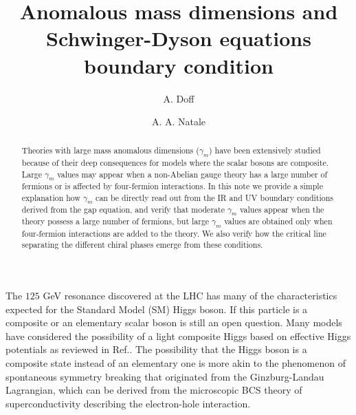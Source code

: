 \documentclass[preprint,amsmath,amssymb,superscriptaddress,showpacs,aps12pt]{revtex4}
\begin{document}
\title{Anomalous mass dimensions and Schwinger-Dyson equations boundary condition}

\author{A. Doff}



\author{A. A. Natale} 



\begin{abstract}
Theories with large mass anomalous dimensions ($\gamma_m$) have been extensively studied because of their deep consequences for models where the scalar bosons are composite. Large $\gamma_m$ values may appear when a non-Abelian gauge theory has a large number of fermions or is affected by four-fermion interactions. In this note we provide a simple explanation how $\gamma_m$ can be directly read out from the IR and UV boundary conditions derived from the gap equation, and verify that moderate $\gamma_m$ values appear when the theory possess a large number of fermions, but large $\gamma_m$ values are obtained only when four-fermion interactions are added to the theory. We also verify how the critical line separating the different chiral phases emerge from these conditions.  
\end{abstract}



\maketitle



\par The $125$ GeV resonance discovered at the LHC \cite{atlas} has many of the characteristics expected for the Standard Model (SM) Higgs boson. If this particle is a composite or an elementary scalar boson is still an open question. Many models have considered the possibility of a light composite Higgs based on effective Higgs potentials as reviewed in Ref.\cite{h1}. The possibility that the Higgs boson is a composite state instead of an elementary one is more akin to the phenomenon of spontaneous symmetry breaking that originated from the Ginzburg-Landau Lagrangian, which can be derived from the microscopic BCS theory of superconductivity describing the electron-hole interaction. 
\end{document}
